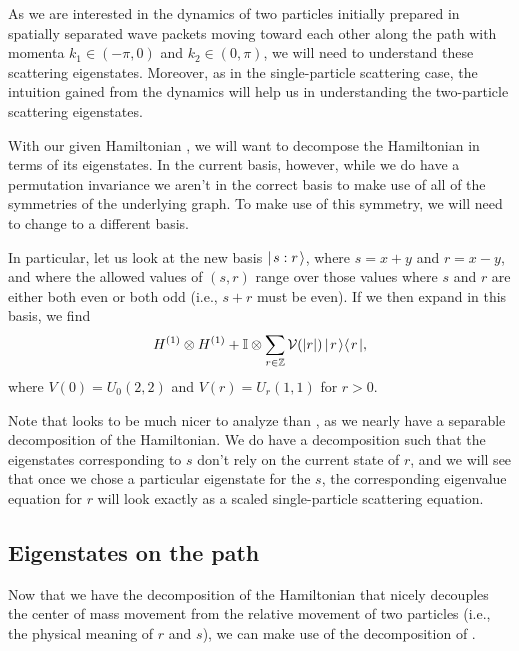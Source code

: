 \documentclass[../thesis-main/thesis-main]{subfiles}
\begin{document}
As we are interested in the dynamics of two particles initially prepared in spatially separated wave packets moving toward each other along the path with momenta $k_1\in(-\pi,0) $ and $k_2\in (0,\pi)$, we will need to understand these scattering eigenstates.  Moreover, as in the single-particle scattering case, the intuition gained from the dynamics will help us in understanding the two-particle scattering eigenstates.

With our given Hamiltonian , we will want to decompose the Hamiltonian in terms of its eigenstates.  In the current basis, however, while we do have a permutation invariance we aren't in the correct basis to make use of all of the symmetries of the underlying graph.  To make use of this symmetry, we will need to change to a different basis.

In particular, let us look at the new basis $|\mspace{2mu} s:r \mspace{2mu} \rangle$, where $s = x+y$ and $r = x-y$, and where the allowed values of $(s,r)$ range over those values where $s$ and $r$ are either both even or both odd (i.e., $s+r$ must be even).  If we then expand  in this basis, we find 
\begin{equation}
  H^{(1)}\otimes H^{(1)} + \mathbb{I}\otimes \sum_{r\in \mathbb{Z}} \mathcal{V}(|r|) \, |\mspace{2mu} r \mspace{2mu} \rangle\langle\mspace{2mu} r \mspace{2mu} |,
\label{eq:two_part_H_rs}
\end{equation}
where $V(0) = U_0(2,2)$ and $V(r) = U_r(1,1)$ for $r >0$.  

Note that  looks to be much nicer to analyze than , as we nearly have a separable decomposition of the Hamiltonian.  We do have a decomposition such that the eigenstates corresponding to $s$ don't rely on the current state of $r$, and we will see that once we chose a particular eigenstate for the $s$, the corresponding eigenvalue equation for $r$ will look exactly as a scaled single-particle scattering equation.

\subsection{Eigenstates on the path}


Now that we have the decomposition of the Hamiltonian that nicely decouples the center of mass movement from the relative movement of two particles (i.e., the physical meaning of $r$ and $s$), we can make use of the decomposition of .  
\end{document}
